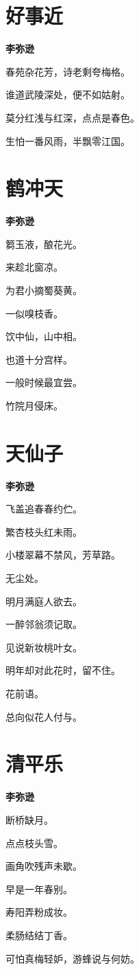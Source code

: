 \documentclass[12pt,a4paper]{ctexbook}
\begin{document}
\section{好事近}
\textbf{李弥逊}\par\vspace{0.5em}
春苑杂花芳，诗老剩夸梅格。\par
谁道武陵深处，便不如姑射。\par
莫分红浅与红深，点点是春色。\par
生怕一番风雨，半飘零江国。\par

\section{鹤冲天}
\textbf{李弥逊}\par\vspace{0.5em}
篘玉液，酿花光。\par
来趁北窗凉。\par
为君小摘蜀葵黄。\par
一似嗅枝香。\par
饮中仙，山中相。\par
也道十分宫样。\par
一般时候最宜尝。\par
竹院月侵床。\par

\section{天仙子}
\textbf{李弥逊}\par\vspace{0.5em}
飞盖追春春约伫。\par
繁杏枝头红未雨。\par
小楼翠幕不禁风，芳草路。\par
无尘处。\par
明月满庭人欲去。\par
一醉邻翁须记取。\par
见说新妆桃叶女。\par
明年却对此花时，留不住。\par
花前语。\par
总向似花人付与。\par

\section{清平乐}
\textbf{李弥逊}\par\vspace{0.5em}
断桥缺月。\par
点点枝头雪。\par
画角吹残声未歇。\par
早是一年春别。\par
寿阳弄粉成妆。\par
柔肠结结丁香。\par
可怕真梅轻妒，游蜂说与何妨。\par
\end{document}
